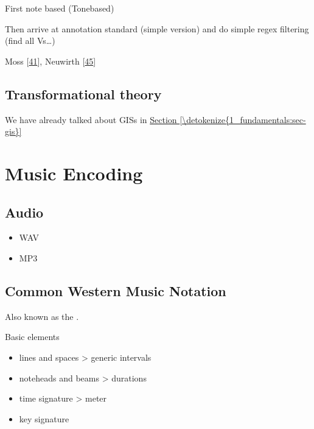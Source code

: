 \documentclass[letterpaper,10pt,english]{sphinxmanual}
\begin{document}
\sphinxAtStartPar
First note based (Tone\sphinxhyphen{}based)

\sphinxAtStartPar
Then arrive at annotation standard (simple version)
and do simple regex filtering (find all Vs…)

\sphinxAtStartPar
Moss  {[}\hyperlink{cite.8_bibliography:id58}{41}{]}, Neuwirth  {[}\hyperlink{cite.8_bibliography:id80}{45}{]}


\section{Transformational theory}
\label{\detokenize{4_harmony:transformational-theory}}
\sphinxAtStartPar
We have already talked about GISs in \hyperref[\detokenize{1_fundamentals:sec-gis}]{Section \ref{\detokenize{1_fundamentals:sec-gis}}}


\chapter{Music Encoding}
\label{\detokenize{encodings:music-encoding}}\label{\detokenize{encodings::doc}}

\section{Audio}
\label{\detokenize{encodings:audio}}\begin{itemize}
\item {} 
\sphinxAtStartPar
WAV

\item {} 
\sphinxAtStartPar
MP3

\end{itemize}


\section{Common Western Music Notation}
\label{\detokenize{encodings:common-western-music-notation}}
\sphinxAtStartPar
Also known as the .

\sphinxAtStartPar
Basic elements
\begin{itemize}
\item {} 
\sphinxAtStartPar
lines and spaces \sphinxhyphen{}\textgreater{} generic intervals

\item {} 
\sphinxAtStartPar
noteheads and beams \sphinxhyphen{}\textgreater{} durations

\item {} 
\sphinxAtStartPar
time signature \textendash{}\textgreater{} meter

\item {} 
\sphinxAtStartPar
key signature

\end{itemize}
\end{document}
